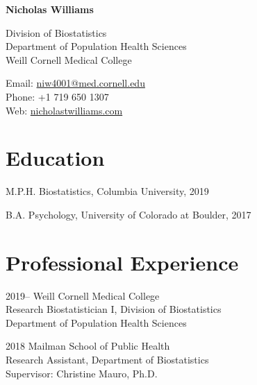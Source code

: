 \documentclass[12pt,letterpaper]{report}
\newcommand{\myname}{Nicholas Williams}
\newcommand{\namefont}[1]{{\normalfont\bfseries\Huge{#1}}}
\begin{document}
    \raggedright

    \namefont{\myname}

    \vspace{1em}
    \begin{minipage}[t]{0.64\textwidth}
        Division of Biostatistics \\
        Department of Population Health Sciences \\
        Weill Cornell Medical College
    \end{minipage}
    \begin{minipage}[t]{0.34\textwidth}
        Email: \href{mailto:niw4001@med.cornell.edu}{niw4001@med.cornell.edu} \\
        Phone: +1 719 650 1307 \\
        Web: \href{https://nicholastwilliams.com/}{nicholastwilliams.com}
    \end{minipage}
    \vspace{0.5em}

    \section*{Education}

    \begin{tablist}

        \item[M.P.H.]  \tab Biostatistics, Columbia University, 2019

        \item[B.A.]  \tab Psychology, University of Colorado at Boulder, 2017

    \end{tablist}

    \section*{Professional Experience}

    \begin{tablist}

        \item[2019--]   \tab Weill Cornell Medical College \\
                             Research Biostatistician I, Division of Biostatistics \\
                             Department of Population Health Sciences 
        
        \item[2018]  \tab Mailman School of Public Health \\
                              Research Assistant, Department of Biostatistics \\
                              Supervisor: Christine Mauro, Ph.D.

    \end{tablist}
\end{document}
